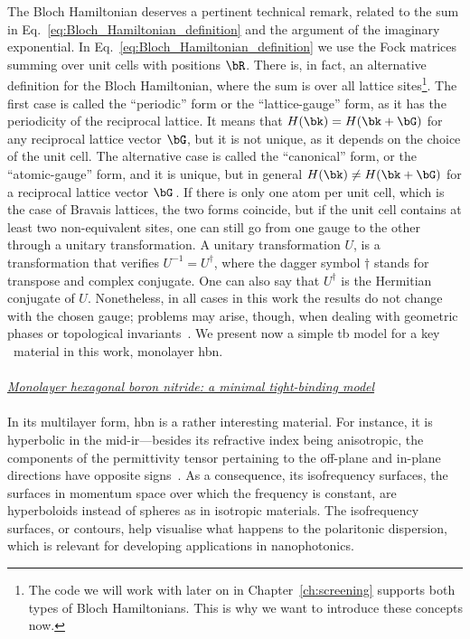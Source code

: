 The Bloch Hamiltonian deserves a pertinent technical remark, related to the sum in Eq.~\eqref{eq:Bloch_Hamiltonian_definition} and the argument of the imaginary exponential.
In Eq.~\eqref{eq:Bloch_Hamiltonian_definition} we use the Fock matrices summing over unit cells with positions $\bR$.
There is, in fact, an alternative definition for the Bloch Hamiltonian, where the sum is over all lattice sites\footnote{The code we will work with later on in Chapter~\ref{ch:screening} supports both types of Bloch Hamiltonians. This is why we want to introduce these concepts now.}.
The first case is called the \enquote{periodic} form or the \enquote{lattice-gauge} form, as it has the periodicity of the reciprocal lattice.
It means that $H(\bk) = H(\bk + \bG)$ for any reciprocal lattice vector $\bG$, but it is not unique, as it depends on the choice of the unit cell.
The alternative case is called the \enquote{canonical} form, or the \enquote{atomic-gauge} form, and it is unique, but in general $H(\bk) \neq H(\bk + \bG)$ for a reciprocal lattice vector $\bG$\,.
If there is only one atom per unit cell, which is the case of Bravais lattices, the two forms coincide, but if the unit cell contains at least two non-equivalent sites, one can still go from one gauge to the other through a unitary transformation.
A unitary transformation $U$, is a transformation that verifies $U^{-1} = U^{\dagger}$, where the dagger symbol $\dagger$ stands for transpose and complex conjugate.
One can also say that $U^{\dagger}$ is the Hermitian conjugate of $U$.
Nonetheless, in all cases in this work the results do not change with the chosen gauge; problems may arise, though, when dealing with geometric phases or topological invariants~\cite{Cayssol_2021}.
We present now a simple \gls{tb} model for a key \bd~material in this work, monolayer \gls{hbn}\@.
\\
\\
\textit{\underline{Monolayer hexagonal boron nitride: a minimal tight-binding model}}
\\
\\
In its multilayer form, \gls{hbn} is a rather interesting material.
For instance, it is hyperbolic in the mid-\gls{ir}---besides its refractive index being anisotropic, the components of the permittivity tensor pertaining to the off-plane and in-plane directions have opposite signs~\cite{Caldwell_2019}.
As a consequence, its isofrequency surfaces, the surfaces in momentum space over which the frequency is constant, are hyperboloids instead of spheres as in isotropic materials.
The isofrequency surfaces, or contours, help visualise what happens to the polaritonic dispersion, which is relevant for developing applications in nanophotonics.

